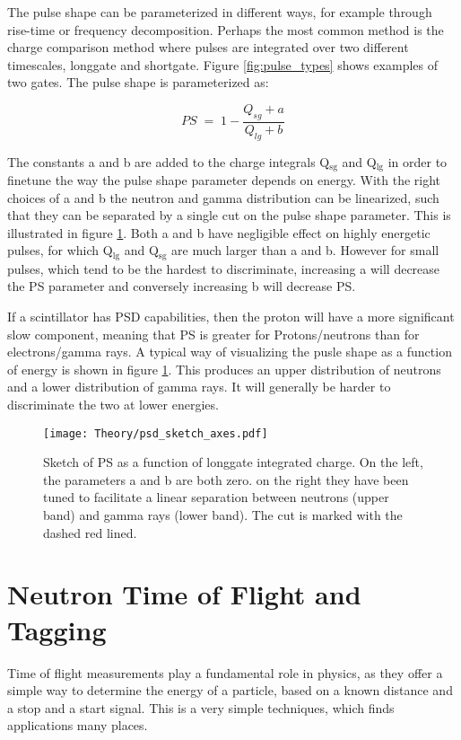 \documentclass[main.tex]{subfiles}
\begin{document}
The pulse shape can be parameterized in different ways, for example through rise-time or frequency decomposition. Perhaps the most common method is the charge comparison method where pulses are integrated over two different timescales, longgate and shortgate. Figure \ref{fig:pulse_types} shows examples of two gates. The pulse shape is parameterized as:

\begin{equation}
	PS \; = \; 1-\frac{Q_{sg} + a}{Q_{lg} + b}
	\label{eq:ps}
\end{equation}

The constants a and b are added to the charge integrals Q$_\text{sg}$ and Q$_\text{lg}$ in order to finetune the way the pulse shape parameter depends on energy. With the right choices of a and b the neutron and gamma distribution can be linearized, such that they can be separated by a single cut on the pulse shape parameter. This is illustrated in figure \ref{fig:psd_sketch}. Both a and b have negligible effect on highly energetic pulses, for which Q$_\textrm{lg}$ and Q$_\textrm{sg}$ are much larger than a and b. However for small pulses, which tend to be the hardest to discriminate, increasing a will decrease the PS parameter and conversely increasing b will decrease PS.

If a scintillator has PSD capabilities, then the proton will have a more significant slow component, meaning that PS is greater for Protons/neutrons than for electrons/gamma rays. A typical way of visualizing the pusle shape as a function of energy is shown in figure \ref{fig:psd_sketch}. This produces an upper distribution of neutrons and a lower distribution of gamma rays. It will generally be harder to discriminate the two at lower energies.
\begin{figure}[ht]
    \centering
        \texttt{[image: Theory/psd\_sketch\_axes.pdf]}
        \caption[Pulse shape discrimination sketch]{Sketch of PS as a function of longgate integrated charge. On the left, the parameters a and b are both zero. on the right they have been tuned to facilitate a linear separation between neutrons (upper band) and gamma rays (lower band). The cut is marked with the dashed red lined.}
    \label{fig:psd_sketch} 
\end{figure}


\section{Neutron Time of Flight and Tagging}
Time of flight measurements play a fundamental role in physics, as they offer a simple way to determine the energy of a particle, based on a known distance and a stop and a start signal. This is a very simple techniques, which finds applications many places.
\end{document}

